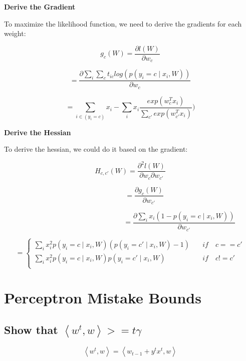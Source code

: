 \documentclass{article} %
\newcommand{\inner}[1]{\left\langle #1 \right\rangle}
\begin{document}
\textbf{Derive the Gradient}

To maximize the likelihood function, we need to derive the gradients for each
weight:

\begin{equation}
g_c (W) = \frac{\partial l(W)}{\partial w_c}
\end{equation}

\begin{equation}
= \frac{\partial \sum_i \sum_c t_{ic} log(p(y_i=c \mid x_i, W))}
{\partial w_c}
\end{equation}

\begin{equation}
= \sum_{i \in (y_i=c) } x_i
- \sum_i x_i \frac{exp(w_c^T x_i)}
{\sum_{c'} exp(w_{c'}^T x_i)})
\end{equation}

\textbf{Derive the Hessian}

To derive the hessian, we could do it based on the gradient:

\begin{equation}
H_{c,c'}(W) = \frac{\partial^2 l(W)}{\partial w_c \partial w_{c'}}
\end{equation}

\begin{equation}
\qquad \qquad = \frac{\partial g_c (W)}{\partial w_{c'}}
\end{equation}

\begin{equation}
\qquad \qquad \qquad \qquad \qquad \qquad \qquad = \frac{\partial \sum_i x_i (1 - p(y_i = c \mid x_i, W))}
{\partial w_{c'}}
\end{equation}

\[=
    \begin{cases}
        \sum_i x_i^2 p(y_i=c \mid x_i,W) (p(y_i=c' \mid x_i,W)-1) & \quad if \quad c == c' \\
        \sum_i x_i^2 p(y_i=c \mid x_i,W) p(y_i=c' \mid x_i,W) & \quad if \quad c != c' \\
    \end{cases}
\]



\section{Perceptron Mistake Bounds}


\subsection{Show that $\inner{w^t, w} >= t \gamma$}
\begin{equation}
\inner{w^t, w} = \inner{w_{t-1} + y^t x^t,w}
\end{equation}
\end{document}
